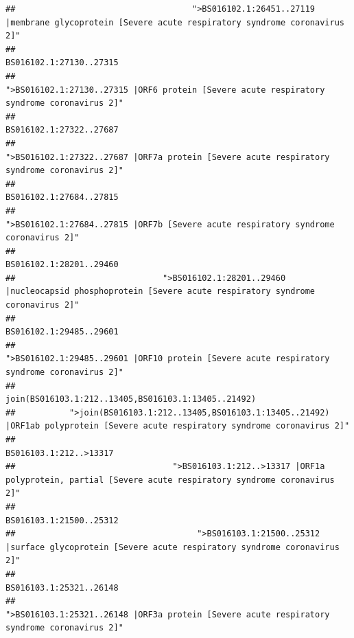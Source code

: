 \documentclass[
]{article}
\begin{document}
\begin{verbatim}
##                                    ">BS016102.1:26451..27119 |membrane glycoprotein [Severe acute respiratory syndrome coronavirus 2]" 
##                                                                                                                BS016102.1:27130..27315 
##                                             ">BS016102.1:27130..27315 |ORF6 protein [Severe acute respiratory syndrome coronavirus 2]" 
##                                                                                                                BS016102.1:27322..27687 
##                                            ">BS016102.1:27322..27687 |ORF7a protein [Severe acute respiratory syndrome coronavirus 2]" 
##                                                                                                                BS016102.1:27684..27815 
##                                                    ">BS016102.1:27684..27815 |ORF7b [Severe acute respiratory syndrome coronavirus 2]" 
##                                                                                                                BS016102.1:28201..29460 
##                              ">BS016102.1:28201..29460 |nucleocapsid phosphoprotein [Severe acute respiratory syndrome coronavirus 2]" 
##                                                                                                                BS016102.1:29485..29601 
##                                            ">BS016102.1:29485..29601 |ORF10 protein [Severe acute respiratory syndrome coronavirus 2]" 
##                                                                                    join(BS016103.1:212..13405,BS016103.1:13405..21492) 
##           ">join(BS016103.1:212..13405,BS016103.1:13405..21492) |ORF1ab polyprotein [Severe acute respiratory syndrome coronavirus 2]" 
##                                                                                                                 BS016103.1:212..>13317 
##                                ">BS016103.1:212..>13317 |ORF1a polyprotein, partial [Severe acute respiratory syndrome coronavirus 2]" 
##                                                                                                                BS016103.1:21500..25312 
##                                     ">BS016103.1:21500..25312 |surface glycoprotein [Severe acute respiratory syndrome coronavirus 2]" 
##                                                                                                                BS016103.1:25321..26148 
##                                            ">BS016103.1:25321..26148 |ORF3a protein [Severe acute respiratory syndrome coronavirus 2]" 

\end{verbatim}
\end{document}
